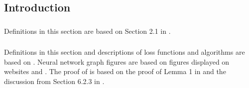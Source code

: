 \subsection{Introduction}
\subsubsection{}
Definitions in this section are based on Section 2.1 in \cite{shalevshwartz_2014_understanding}.
\subsubsection{}
Definitions in this section and descriptions of loss functions and algorithms are based on \cite{higham_2018_deep}. Neural network graph figures are based on figures displayed on websites \cite{neutelings_neural} and \cite{stutz_2020_illustrating}. 
The proof of  is based on the proof of Lemma 1 in \cite{higham_2018_deep} and the discussion from Section 6.2.3 in \cite{calin_2020_deep}.